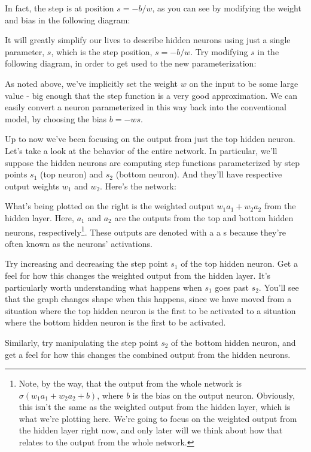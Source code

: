 In fact, the step is at position $s = -b/w$, as you can see by modifying the
weight and bias in the following diagram:


It will greatly simplify our lives to describe hidden neurons using just a
single parameter, $s$, which is the step position, $s = -b/w$. Try modifying $s$
in the following diagram, in order to get used to the new parameterization:


As noted above, we've implicitly set the weight $w$ on the input to be some
large value - big enough that the step function is a very good approximation. We
can easily convert a neuron parameterized in this way back into the conventional
model, by choosing the bias $b = -w s$.

Up to now we've been focusing on the output from just the top hidden
neuron. Let's take a look at the behavior of the entire network. In particular,
we'll suppose the hidden neurons are computing step functions parameterized by
step points $s_1$ (top neuron) and $s_2$ (bottom neuron). And they'll have
respective output weights $w_1$ and $w_2$. Here's the network:

What's being plotted on the right is the weighted output $w_1 a_1 + w_2 a_2$
from the hidden layer. Here, $a_1$ and $a_2$ are the outputs from the top and
bottom hidden neurons, respectively\footnote{Note, by the way, that the output
  from the whole network is $\sigma(w_1 a_1+w_2 a_2 + b)$, where $b$ is the bias
  on the output neuron. Obviously, this isn't the same as the weighted output
  from the hidden layer, which is what we're plotting here. We're going to focus
  on the weighted output from the hidden layer right now, and only later will we
  think about how that relates to the output from the whole network.}. These
outputs are denoted with a a s because they're often known as the neurons'
activations.

Try increasing and decreasing the step point $s_1$ of the top hidden neuron. Get
a feel for how this changes the weighted output from the hidden layer. It's
particularly worth understanding what happens when $s_1$ goes past $s_2$. You'll
see that the graph changes shape when this happens, since we have moved from a
situation where the top hidden neuron is the first to be activated to a
situation where the bottom hidden neuron is the first to be activated.

Similarly, try manipulating the step point $s_2$ of the bottom hidden neuron,
and get a feel for how this changes the combined output from the hidden neurons.

